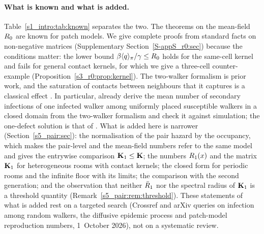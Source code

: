 \paragraph{What is known and what is added.}
Table~\ref{s1_intro:tab:known} separates the two. The theorems on the mean-field $R_0$ are known for patch
models. We give complete proofs from standard facts on non-negative matrices (Supplementary
Section~\ref{S-appS_r0:sec}) because the conditions matter: the lower bound $\beta\langle q\rangle_{\pi}/\gamma\le R_0$ holds for
the same-cell kernel and fails for general contact kernels, for which we give a three-cell counter-example
(Proposition~\ref{s3_r0:prop:kernel}).
The two-walker formalism is prior work, and the saturation of contacts between neighbours that it captures
is a classical effect \citep{ball1997epidemics,keeling1999effects,durrett1994importance}. In particular,
\citet{giuggioli2022spatio} already derive the mean number of secondary infections of one infected walker
among uniformly placed susceptible walkers in a closed domain from the two-walker formalism and check it
against simulation; the one-defect solution is that of \citet{szabo1984localized}. What is added here is
narrower (Section~\ref{s5_pair:sec}): the normalisation of the pair hazard by the occupancy, which makes the
pair-level and the mean-field numbers refer to the same model and gives the entrywise comparison
$\mathbf{K}_1\le\mathbf{K}$; the numbers $R_1(x)$ and the matrix $\mathbf{K}_1$ for heterogeneous rooms with contact
kernels; the closed form for periodic rooms and the infinite floor with its limits; the comparison with the
second generation; and the observation that neither $\bar{R}_1$ nor the spectral radius of $\mathbf{K}_1$ is a
threshold quantity (Remark~\ref{s5_pair:rem:threshold}). These statements of what is added rest on a targeted
search (Crossref and arXiv queries on infection among random walkers, the diffusive epidemic process and
patch-model reproduction numbers, 1~October 2026), not on a systematic review.

